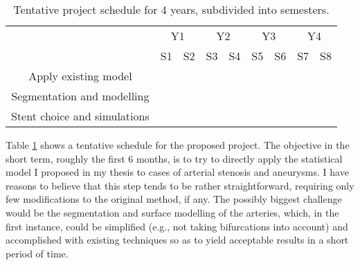 \documentclass[a4paper]{article}
\begin{document}

\begin{table}[h]\centering
\caption{Tentative project schedule for 4 years, subdivided into semesters.}
\begin{tabular}{c|c|c|c|c|c|c|c|c|}
\cline{2-9}
 & \multicolumn{2}{|c|}{Y1} & \multicolumn{2}{|c|}{Y2} & \multicolumn{2}{|c|}{Y3} & \multicolumn{2}{|c|}{Y4} \\ \cline{2-9}
 & S1 & S2 & S3 & S4 & S5 & S6 & S7 & S8  \\ \hline
\multicolumn{1}{|c|}{Apply existing model} & & & & & & & & \\ \hline
\multicolumn{1}{|c|}{Segmentation and modelling} & & & & & & & & \\ \hline
\multicolumn{1}{|c|}{Stent choice and simulations} & & & & & & & & \\ \hline
\end{tabular}
\label{tab:schedule}
\end{table}

Table \ref{tab:schedule} shows a tentative schedule for the proposed project. The objective in the short term, roughly the first 6 months, is to try to directly apply the statistical model I proposed in my thesis to cases of arterial stenosis and aneurysms. I have reasons to believe that this step tends to be rather straightforward, requiring only few modifications to the original method, if any. The possibly biggest challenge would be the segmentation and surface modelling of the arteries, which, in the first instance, could be simplified (e.g., not taking bifurcations into account) and accomplished with existing techniques so as to yield acceptable results in a short period of time. 
\end{document}
